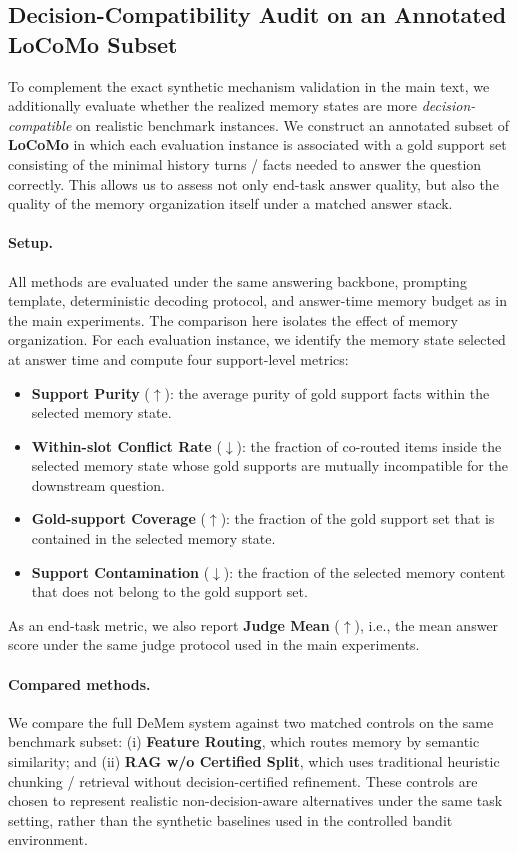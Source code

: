 \documentclass{article}
\theoremstyle{plain}
\theoremstyle{definition}
\theoremstyle{remark}
\begin{document}
\subsection{Decision-Compatibility Audit on an Annotated LoCoMo Subset}
\label{app:locomo-audit}

To complement the exact synthetic mechanism validation in the main text, we additionally evaluate whether the realized memory states are more \emph{decision-compatible} on realistic benchmark instances.
We construct an annotated subset of \textbf{LoCoMo} in which each evaluation instance is associated with a gold support set consisting of the minimal history turns / facts needed to answer the question correctly.
This allows us to assess not only end-task answer quality, but also the quality of the memory organization itself under a matched answer stack.

\paragraph{Setup.}
All methods are evaluated under the same answering backbone, prompting template, deterministic decoding protocol, and answer-time memory budget as in the main experiments.
The comparison here isolates the effect of memory organization.
For each evaluation instance, we identify the memory state selected at answer time and compute four support-level metrics:
\begin{itemize}
    \item \textbf{Support Purity} ($\uparrow$): the average purity of gold support facts within the selected memory state.
    \item \textbf{Within-slot Conflict Rate} ($\downarrow$): the fraction of co-routed items inside the selected memory state whose gold supports are mutually incompatible for the downstream question.
    \item \textbf{Gold-support Coverage} ($\uparrow$): the fraction of the gold support set that is contained in the selected memory state.
    \item \textbf{Support Contamination} ($\downarrow$): the fraction of the selected memory content that does not belong to the gold support set.
\end{itemize}
As an end-task metric, we also report \textbf{Judge Mean} ($\uparrow$), i.e., the mean answer score under the same judge protocol used in the main experiments.

\paragraph{Compared methods.}
We compare the full DeMem system against two matched controls on the same benchmark subset:
(i) \textbf{Feature Routing}, which routes memory by semantic similarity;
and (ii) \textbf{RAG w/o Certified Split}, which uses traditional heuristic chunking / retrieval without decision-certified refinement.
These controls are chosen to represent realistic non-decision-aware alternatives under the same task setting, rather than the synthetic baselines used in the controlled bandit environment.
\end{document}
